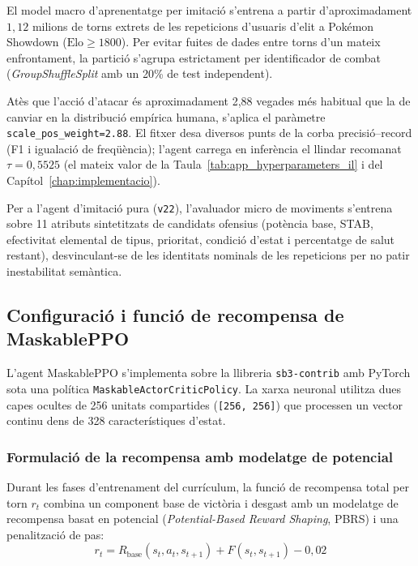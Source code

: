 El model macro d'aprenentatge per imitació s'entrena a partir d'aproximadament $1{,}12$ milions de torns extrets de les repeticions d'usuaris d'elit a Pokémon Showdown ($\text{Elo} \ge 1800$). Per evitar fuites de dades entre torns d'un mateix enfrontament, la partició s'agrupa estrictament per identificador de combat (\textit{GroupShuffleSplit} amb un 20\% de test independent).

Atès que l'acció d'atacar és aproximadament 2,88 vegades més habitual que la de canviar en la distribució empírica humana, s'aplica el paràmetre \texttt{scale\_pos\_weight=2.88}. El fitxer  desa diversos punts de la corba precisió--record (F1 i igualació de freqüència); l'agent carrega en inferència el llindar recomanat $\tau = 0{,}5525$ (el mateix valor de la Taula~\ref{tab:app_hyperparameters_il} i del Capítol~\ref{chap:implementacio}).

Per a l'agent d'imitació pura (\texttt{v22}), l'avaluador micro de moviments s'entrena sobre 11 atributs sintetitzats de candidats ofensius (potència base, STAB, efectivitat elemental de tipus, prioritat, condició d'estat i percentatge de salut restant), desvinculant-se de les identitats nominals de les repeticions per no patir inestabilitat semàntica.

\subsection{Configuració i funció de recompensa de MaskablePPO}

L'agent MaskablePPO s'implementa sobre la llibreria \texttt{sb3-contrib} amb PyTorch sota una política \texttt{MaskableActorCriticPolicy}. La xarxa neuronal utilitza dues capes ocultes de 256 unitats compartides (\texttt{[256, 256]}) que processen un vector continu dens de 328 característiques d'estat.

\subsubsection{Formulació de la recompensa amb modelatge de potencial}

Durant les fases d'entrenament del currículum, la funció de recompensa total per torn $r_t$ combina un component base de victòria i desgast amb un modelatge de recompensa basat en potencial (\textit{Potential-Based Reward Shaping}, PBRS) i una penalització de pas:
\begin{equation}
    r_t = R_{\mathrm{base}}(s_t, a_t, s_{t+1}) + F(s_t, s_{t+1}) - 0{,}02
    \label{eq:ppo_reward_formula}
\end{equation}

